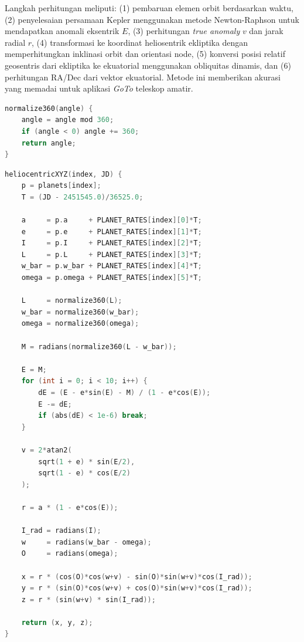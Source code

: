 Langkah perhitungan meliputi: (1) pembaruan elemen orbit berdasarkan waktu, (2) penyelesaian persamaan Kepler menggunakan metode Newton-Raphson untuk mendapatkan anomali eksentrik $E$, (3) perhitungan \textit{true anomaly} $v$ dan jarak radial $r$, (4) transformasi ke koordinat heliosentrik ekliptika dengan memperhitungkan inklinasi orbit dan orientasi node, (5) konversi posisi relatif geosentris dari ekliptika ke ekuatorial menggunakan obliquitas dinamis, dan (6) perhitungan RA/Dec dari vektor ekuatorial. Metode ini memberikan akurasi yang memadai untuk aplikasi \textit{GoTo} teleskop amatir. \par

\begin{lstlisting}[caption={Pseudocode Fungsi Pembantu: Normalisasi Sudut 0--360$^{\circ}$}, label={code:4.pseudocode_normalize}, language=C]
normalize360(angle) {
    angle = angle mod 360;
    if (angle < 0) angle += 360;
    return angle;
}
\end{lstlisting}

\begin{lstlisting}[caption={Pseudocode Perhitungan Posisi Heliosentrik Planet}, label={code:4.pseudocode_heliocentric}, language=C]
heliocentricXYZ(index, JD) {
    p = planets[index];
    T = (JD - 2451545.0)/36525.0;

    a     = p.a     + PLANET_RATES[index][0]*T;
    e     = p.e     + PLANET_RATES[index][1]*T;
    I     = p.I     + PLANET_RATES[index][2]*T;
    L     = p.L     + PLANET_RATES[index][3]*T;
    w_bar = p.w_bar + PLANET_RATES[index][4]*T;
    omega = p.omega + PLANET_RATES[index][5]*T;

    L     = normalize360(L);
    w_bar = normalize360(w_bar);
    omega = normalize360(omega);

    M = radians(normalize360(L - w_bar));

    E = M;
    for (int i = 0; i < 10; i++) {
        dE = (E - e*sin(E) - M) / (1 - e*cos(E));
        E -= dE;
        if (abs(dE) < 1e-6) break;
    }

    v = 2*atan2(
        sqrt(1 + e) * sin(E/2),
        sqrt(1 - e) * cos(E/2)
    );

    r = a * (1 - e*cos(E));

    I_rad = radians(I);
    w     = radians(w_bar - omega);
    O     = radians(omega);

    x = r * (cos(O)*cos(w+v) - sin(O)*sin(w+v)*cos(I_rad));
    y = r * (sin(O)*cos(w+v) + cos(O)*sin(w+v)*cos(I_rad));
    z = r * (sin(w+v) * sin(I_rad));

    return (x, y, z);
}
\end{lstlisting}

